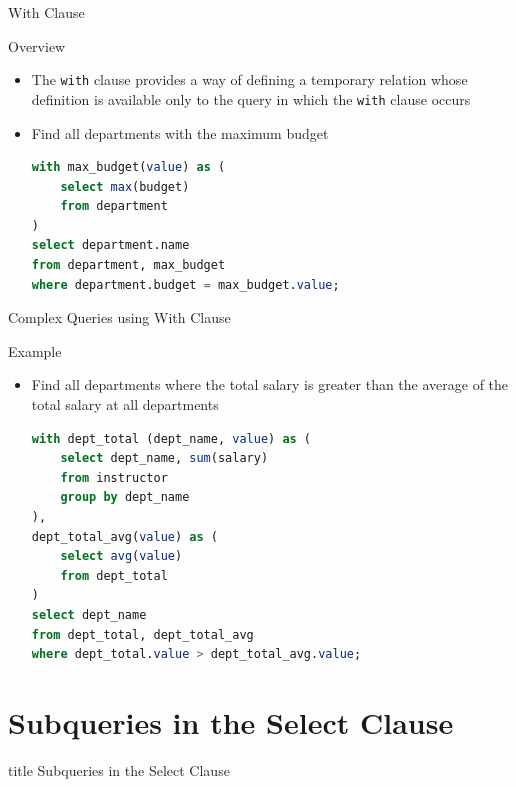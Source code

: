 \documentclass[aspectratio=169, xcolor=dvipsnames]{beamer}
\begin{document}
\begin{frame}[fragile]{With Clause}
    \begin{block}{Overview}
        \begin{itemize}[<+->]
            \item The \texttt{with} clause provides a way of defining a temporary relation whose definition is available only to the query in which the \texttt{with} clause occurs
            \item Find all departments with the maximum budget
            \begin{lstlisting}[language=SQL]
with max_budget(value) as ( 
    select max(budget) 
    from department 
) 
select department.name 
from department, max_budget 
where department.budget = max_budget.value;
            \end{lstlisting}
        \end{itemize}
    \end{block}
\end{frame}

\begin{frame}[fragile]{Complex Queries using With Clause}
    \begin{exampleblock}{Example}
        \begin{itemize}[<+->]
            \item Find all departments where the total salary is greater than the average of the total salary at all departments
            \begin{lstlisting}[language=SQL, basicstyle=\ttfamily\scriptsize]
with dept_total (dept_name, value) as (
    select dept_name, sum(salary) 
    from instructor 
    group by dept_name
),
dept_total_avg(value) as (
    select avg(value) 
    from dept_total
) 
select dept_name 
from dept_total, dept_total_avg 
where dept_total.value > dept_total_avg.value;
            \end{lstlisting}
        \end{itemize}
    \end{exampleblock}
\end{frame}

\section{Subqueries in the Select Clause}

\begin{frame}
  \vfill
  \centering
  \begin{beamercolorbox}[sep=8pt,center,shadow=true,rounded=true]{title}
    Subqueries in the Select Clause\par%
  \end{beamercolorbox}
  \vfill
\end{frame}
\end{document}
